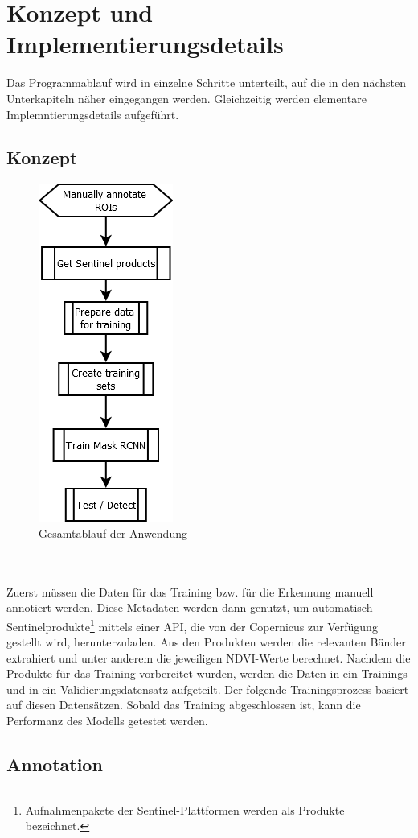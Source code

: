 \chapter{Konzept und Implementierungsdetails}\label{chap:concept}

Das Programmablauf wird in einzelne Schritte unterteilt, auf die in den nächsten Unterkapiteln näher eingegangen werden. Gleichzeitig werden elementare Implemntierungsdetails aufgeführt.

\section{Konzept}\label{sec:concept}

\begin{figure}[ht]
  \centering
  \includegraphics[width=.2\textwidth]{pics/overview.PNG}
  \caption{Gesamtablauf der Anwendung}
  \label{fig:overview}
\end{figure}
\noindent
\\\\
Zuerst müssen die Daten für das Training bzw. für die Erkennung manuell annotiert werden. Diese Metadaten werden dann genutzt, um automatisch Sentinelprodukte\footnote{Aufnahmenpakete der Sentinel-Plattformen werden als Produkte bezeichnet.} mittels einer API, die von der Copernicus zur Verfügung gestellt wird, herunterzuladen. Aus den Produkten werden die relevanten Bänder extrahiert und unter anderem die jeweiligen NDVI-Werte berechnet. Nachdem die Produkte für das Training vorbereitet wurden, werden die Daten in ein Trainings- und in ein Validierungsdatensatz aufgeteilt. Der folgende Trainingsprozess basiert auf diesen Datensätzen. Sobald das Training abgeschlossen ist, kann die Performanz des Modells getestet werden. 

\section{Annotation}\label{sec:annotation}


